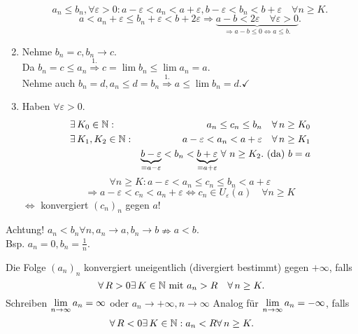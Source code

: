 \documentclass[../ana1.tex]{subfiles}
\begin{document}
\begin{bew}
\begin{enumerate}
		\[ a_n \leq b_n, \forall \varepsilon > 0: a-\varepsilon < a_n<a + \varepsilon, b-\varepsilon < b_n < b + \varepsilon \quad \forall n\geq K. \]
		\[ a < a_n + \varepsilon \leq b_n + \varepsilon < b + 2\varepsilon \Rightarrow \underbrace{a-b < 2\varepsilon \quad \forall \varepsilon > 0}_{\Rightarrow a-b\leq 0 \Leftrightarrow a\leq b.}. \]
		\item Nehme \(b_n = c, b_n \rightarrow c \).\\
		Da \(b_n = c \leq a_n \overset{1.}{\Rightarrow} c= \lim b_n \leq \lim a_n = a \).\\
		Nehme auch \(b_n = d, a_n \leq d = b_n \overset{1.}{\Rightarrow} a \leq \lim b_n = d. \checkmark \)
		\item Haben \(\forall \varepsilon > 0 \).
		\begin{align*}
			&\exists K_0 \in\N: &a_n \leq c_n \leq b_n \quad \forall n\geq K_0\\
			&\exists K_1, K_2 \in\N: &a-\varepsilon < a_n < a + \varepsilon \quad \forall n\geq K_1\\
			&&\underbrace{b-\varepsilon}_{=a-\varepsilon} < b_n < \underbrace{b + \varepsilon}_{=a+\varepsilon} \, \forall \, n \geq K_2. \text{ (da) }b=a
		\end{align*}
		\[\forall  n\geq K: a-\varepsilon < a_n \leq c_n \leq b_n < a+\varepsilon \]
		\[ \Rightarrow a-\varepsilon < c_n < a_n + \varepsilon \Leftrightarrow c_n\in U_\varepsilon(a) \quad \forall n\geq K \]
		\( \Leftrightarrow \) konvergiert \( {(c_n)}_n \) gegen \( a \)!
	\end{enumerate}
\end{bew}

Achtung! \( a_n < b_n \forall n, a_n \rightarrow a, b_n \rightarrow b \nRightarrow  a<b \).\\
Bsp. \(a_n = 0, b_n = \frac{1}{n} \).

\begin{defi}
	Die Folge \( {(a_n)}_n \) konvergiert uneigentlich (divergiert bestimmt) gegen \(+\infty \), falls
	\[ \forall R>0 \exists K\in\N \text{ mit } a_n >R \quad \forall n\geq K. \]
	Schreiben \( \lim\limits_{n\rightarrow\infty} a_n = \infty \) oder \( a_n \rightarrow +\infty, n\rightarrow \infty \)
	Analog für \( \lim\limits_{n\rightarrow\infty} a_n = -\infty \), falls
	\[ \forall R<0 \exists K\in\N: a_n < R \forall n\geq K. \]
\end{defi}
\end{document}
